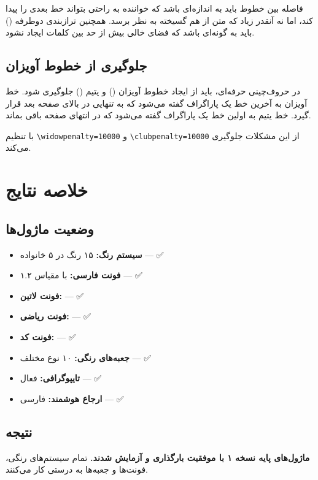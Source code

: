 \documentclass{matinbook}
\begin{document}
فاصله بین خطوط باید به اندازه‌ای باشد که خواننده به راحتی بتواند
خط بعدی را پیدا کند، اما نه آنقدر زیاد که متن از هم گسیخته به نظر برسد.
همچنین ترازبندی دوطرفه () باید به گونه‌ای باشد که
فضای خالی بیش از حد بین کلمات ایجاد نشود.

\section{جلوگیری از خطوط آویزان}

در حروف‌چینی حرفه‌ای، باید از ایجاد خطوط آویزان () و
یتیم () جلوگیری شود. خط آویزان به آخرین خط یک پاراگراف
گفته می‌شود که به تنهایی در بالای صفحه بعد قرار گیرد. خط یتیم
به اولین خط یک پاراگراف گفته می‌شود که در انتهای صفحه باقی بماند.

 با تنظیم \texttt{\textbackslash widowpenalty=10000}
و \texttt{\textbackslash clubpenalty=10000} از این مشکلات جلوگیری می‌کند.

\chapter{خلاصه نتایج}

\section{وضعیت ماژول‌ها}

\begin{itemize}
    \item \textcolor{matingreen}{\textbf{سیستم رنگ:}} ۱۵ رنگ در ۵ خانواده --- ✅
    \item \textcolor{matingreen}{\textbf{فونت فارسی:}}  با مقیاس ۱.۲ --- ✅
    \item \textcolor{matingreen}{\textbf{فونت لاتین:}}  --- ✅
    \item \textcolor{matingreen}{\textbf{فونت ریاضی:}}  --- ✅
    \item \textcolor{matingreen}{\textbf{فونت کد:}}  --- ✅
    \item \textcolor{matingreen}{\textbf{جعبه‌های رنگی:}} ۱۰ نوع مختلف --- ✅
    \item \textcolor{matinggreen}{\textbf{تایپوگرافی:}}  فعال --- ✅
    \item \textcolor{matingreen}{\textbf{ارجاع هوشمند:}}  فارسی --- ✅
\end{itemize}

\section{نتیجه}

\textbf{ماژول‌های پایه  نسخه ۱ با موفقیت بارگذاری و آزمایش شدند.}
تمام سیستم‌های رنگی، فونت‌ها و جعبه‌ها به درستی کار می‌کنند. 🎉
\end{document}
